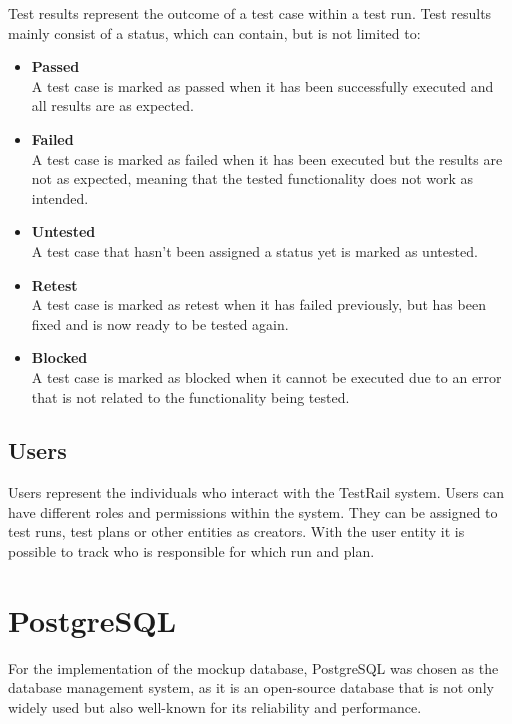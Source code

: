 Test results represent the outcome of a test case within a test run. Test results mainly consist of a status, which can contain, but is not limited to:

\begin{itemize}
    \item \textbf{Passed} \\
    A test case is marked as passed when it has been successfully executed and all results are as expected.

    \item \textbf{Failed} \\
    A test case is marked as failed when it has been executed but the results are not as expected, meaning that the tested functionality does not work as intended.

    \item \textbf{Untested} \\
    A test case that hasn't been assigned a status yet is marked as untested.

    \item \textbf{Retest} \\
    A test case is marked as retest when it has failed previously, but has been fixed and is now ready to be tested again.

    \item \textbf{Blocked} \\
    A test case is marked as blocked when it cannot be executed due to an error that is not related to the functionality being tested.
\end{itemize}

\subsection{Users}

Users represent the individuals who interact with the TestRail system. Users can have different roles and permissions within the system. They can be assigned to test runs, test plans or other entities as creators. With the user entity it is possible to track who is responsible for which run and plan.

\section{PostgreSQL}

For the implementation of the mockup database, PostgreSQL was chosen as the database management system, as it is an open-source database that is not only widely used but also well-known for its reliability and performance. 

